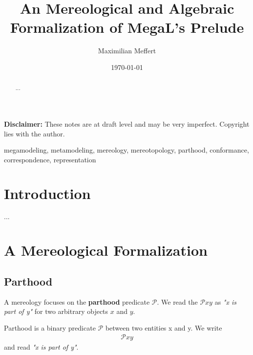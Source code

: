 \documentclass[runningheads,a4paper]{llncs}
\title{An Mereological and Algebraic Formalization of MegaL's Prelude}
\author{Maximilian Meffert}
\date{\today}
\begin{document}
\maketitle

{
\Large
\noindent 
\textbf{Disclaimer:}
\newline\noindent
These notes are at draft level and may be very imperfect.
\newline\noindent
Copyright lies with the author.
}

\begin{abstract}
...
\end{abstract}

\begin{keywords}
megamodeling, 
metamodeling, 
mereology, 
mereotopology,
parthood, 
conformance,
correspondence,
representation
\end{keywords}

\section{Introduction}
...

\section{A Mereological Formalization}

\subsection{Parthood}


A mereology focuses on the \textbf{parthood} predicate $\mathcal{P}$.  
We read the $\mathcal{P}xy$ as \textit{"x is part of y"} for two arbitrary objects $x$ and $y$.
\cite{DBLP:journals/dke/Varzi96}


\begin{definition}[Parthood]
Parthood is a binary predicate $\mathcal{P}$ between two entities x and y. We write
\begin{align}
\mathcal{P} x y
\end{align}
and read \textit{"x is part of y"}.
\end{definition}
\end{document}

